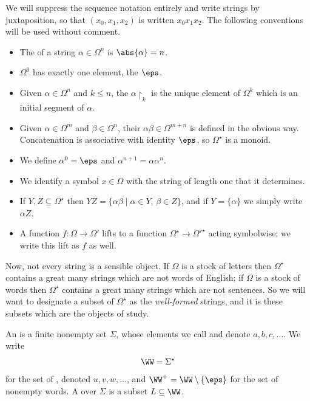 We will suppress the sequence notation entirely and write strings by juxtaposition, so that $(x_0, x_1, x_2)$ is written $x_0x_1x_2$. The following conventions will be used without comment.
\begin{itemize}
	\item The  of a string $\alpha \in \Omega^n$ is $\abs{\alpha} = n$.
	\item $\Omega^0$ has exactly one element, the  $\eps$.
	\item Given $\alpha \in \Omega^n$ and $k \leq n$, the  $\alpha\restriction_k$ is the unique element of $\Omega^k$ which is an initial segment of $\alpha$.
	\item Given $\alpha \in \Omega^m$ and $\beta \in \Omega^n$, their  $\alpha\beta \in \Omega^{m+n}$ is defined in the obvious way. Concatenation is associative with identity $\eps$, so $\Omega^\star$ is a monoid.
	\item We define $\alpha^0 = \eps$ and $\alpha^{n+1} = \alpha\alpha^n$.
	\item We identify a symbol $x \in \Omega$ with the string of length one that it determines.
	\item If $Y, Z \subseteq \Omega^\star$ then $YZ = \{\alpha\beta \mid \alpha \in Y,\, \beta \in Z\}$, and if $Y = \{\alpha\}$ we simply write $\alpha Z$.
	\item A function $f \colon \Omega \to \Omega'$ lifts to a function $\Omega^\star \to \Omega'^\star$ acting symbolwise; we write this lift as $f$ as well.
\end{itemize}

Now, not every string is a sensible object. If $\Omega$ is a stock of letters then $\Omega^\star$ contains a great many strings which are not words of English; if $\Omega$ is a stock of words then $\Omega^\star$ contains a great many strings which are not sentences. So we will want to designate a subset of $\Omega^\star$ as the \emph{well-formed} strings, and it is these subsets which are the objects of study.

\begin{definition}
	An  is a finite nonempty set $\Sigma$, whose elements we call  and denote $a, b, c, \dots$. We write
	$$\WW = \Sigma^\star$$
	for the set of , denoted $u, v, w, \dots$, and $\WW^+ = \WW \setminus \{\eps\}$ for the set of nonempty words. A  over $\Sigma$ is a subset $L \subseteq \WW$.
\end{definition}

